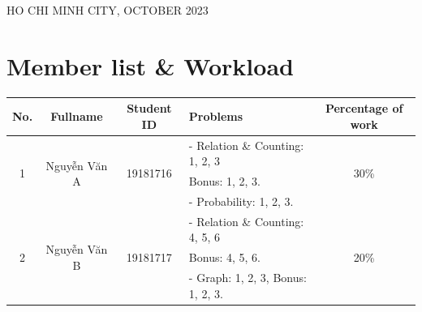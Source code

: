 \documentclass[a4paper]{article}
\begin{document}
\begin{titlepage}

\vspace*{1cm}
	

\begin{center}
{\footnotesize HO CHI MINH CITY, OCTOBER 2023}
\end{center}
\end{titlepage}



\newpage
\tableofcontents
\newpage


\section{Member list \& Workload}

\begin{center}
\begin{tabular}{|c|c|c|l|c|}
\hline
\textbf{No.} & \textbf{Fullname} & \textbf{Student ID} & \textbf{Problems} & \textbf{Percentage of work}\\
\hline 
\multirow{3}{*}{1} & \multirow{3}{*}{Nguyễn Văn A} & \multirow{3}{*}{19181716} & - Relation \& Counting: 1, 2, 3& \multirow{3}{*}{30\%}\\
 & &  & Bonus: 1, 2, 3. &\\
 & &  & - Probability: 1, 2, 3. &\\
\hline 
\multirow{3}{*}{2} & \multirow{3}{*}{Nguyễn Văn B} & \multirow{3}{*}{19181717} & - Relation \& Counting: 4, 5, 6& \multirow{3}{*}{20\%}\\
 & &  & Bonus: 4, 5, 6. &\\
 & &  & - Graph: 1, 2, 3, Bonus: 1, 2, 3. &\\
\hline
\end{tabular}
\end{center}
\end{document}
